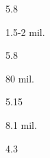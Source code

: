 \begin{description}[font=\normalfont,style=nextline]
\pagebreak
 \item[\langnameIbibio] 
 \begin{multicols}{2}\begin{description}[font=\normalfont\itshape,noitemsep] 
 \item[] 
 \item[\pbnumberabbr] 5.8 
 \item[\family] \famNigerCongo 
 \item[]
\item[\nativespeakers] 1.5-2 mil. 
 \item[\region] \regionSNigeria 
 \end{description}\end{multicols}
\item[\langnameIbo] 
 \begin{multicols}{2}\begin{description}[font=\normalfont\itshape,noitemsep] 
 \item[] 
 \item[\pbnumberabbr] 5.8 
 \item[\family] \famNigerCongo 
 \item[]
\item[\nativespeakers] 80 mil. 
 \item[\region] \regionNigeria 
 \end{description}\end{multicols}
\item[\langnameIlocano] 
 \begin{multicols}{2}\begin{description}[font=\normalfont\itshape,noitemsep] 
 \item[] 
 \item[\pbnumberabbr] 5.15 
 \item[\family] \famAustronesian 
 \item[]
\item[\nativespeakers] 8.1 mil. 
 \item[\region] \regionPhilippines 
 \end{description}\end{multicols}
\item[\langnameIndonesian] 
 \begin{multicols}{2}\begin{description}[font=\normalfont\itshape,noitemsep] 
 \item[] 
 \item[\pbnumberabbr] 4.3 
 \item[\family] \famAustronesian 
 \item[]

\end{description}
\end{multicols}
\end{description}
